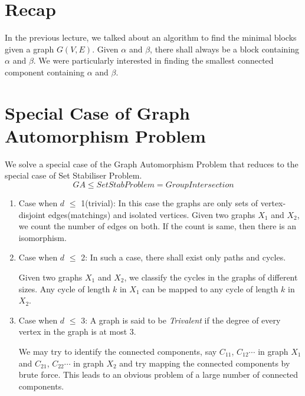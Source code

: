 
\section{Recap}
In the previous lecture, we talked about an algorithm to find the minimal blocks given a graph $G(V,E)$. Given $\alpha$ and $\beta$, there shall always be a block containing $\alpha$ and $\beta$. We were particularly interested in finding the smallest connected component containing $\alpha$ and $\beta$.

\section{Special Case of Graph Automorphism Problem}
We solve a special case of the Graph Automorphism Problem that reduces to the special case of Set Stabiliser Problem. 
\[ GA \leqslant SetStab Problem = Group Intersection \]

\begin{enumerate}
	\item Case when $d$ $\leqslant$ 1(trivial): 
	In this case the graphs are only sets of vertex-disjoint edges(matchings) and isolated vertices. Given two graphs $X_1$ and $X_2$, we count the number of edges on both. If the count is same, then there is an isomorphism. 
	
	\item Case when $d$ $\leqslant$ 2:
	In such a case, there shall exist only paths and cycles.
	
	Given two graphs $X_1$ and $X_2$, we classify the cycles in the graphs of different sizes. Any cycle of length $k$ in $X_1$ can be mapped to any cycle of length $k$ in $X_2$.
	
	\item Case when $d$ $\leqslant$ 3:
A graph is said to be {\em Trivalent} if the degree of every vertex in the graph is at most 3.

	
	We may try to identify the connected components, say $C_{11}$, $C_{12}\cdots$ in graph $X_1$ and $C_{21}$, $C_{22} \cdots$ in graph $X_2$ and try mapping the connected components by brute force. This leads to an obvious problem of a large number of connected components.	 
\end{enumerate}	

